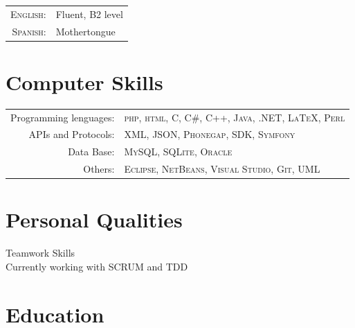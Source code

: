 \documentclass[a4paper,10pt]{article} %
\begin{document}
\begin{tabular}{rl}
\textsc{English:} & Fluent, B2 level\\

\textsc{Spanish:} & Mothertongue\\

\end{tabular} 


\section{Computer Skills}

\begin{tabular}{rl}
Programming lenguages: & \textsc{php}, \textsc{html}, \textsc{C},
\textsc{C\#}, \textsc{C++}, \textsc{Java}, \textsc{.NET}, \textsc{LaTeX},
\textsc{Perl}\\

APIs and Protocols:  & \textsc{XML}, \textsc{JSON}, \textsc{Phonegap},
\textsc{SDK}, \textsc{Symfony}\\

Data Base: & \textsc{MySQL}, \textsc{SQLite}, \textsc{Oracle}\\

Others: & \textsc{Eclipse}, \textsc{NetBeans}, \textsc{Visual Studio},
\textsc{Git}, \textsc{UML} \\

\end{tabular}

\section{Personal Qualities}

Teamwork Skills \\
Currently working with SCRUM and TDD\\


\section{Education}
\end{document}
